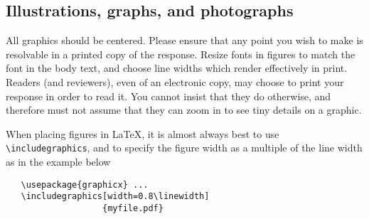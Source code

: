 \documentclass[10pt,twocolumn,letterpaper]{article}
\begin{document}
\subsection{Illustrations, graphs, and photographs}

All graphics should be centered.
Please ensure that any point you wish to make is resolvable in a printed copy of the response.
Resize fonts in figures to match the font in the body text, and choose line widths which render effectively in print.
Readers (and reviewers), even of an electronic copy, may choose to print your response in order to read it.
You cannot insist that they do otherwise, and therefore must not assume that they can zoom in to see tiny details on a graphic.

When placing figures in \LaTeX, it is almost always best to use \verb+\includegraphics+, and to specify the  figure width as a multiple of the line width as in the example below
{\small\begin{verbatim}
   \usepackage{graphicx} ...
   \includegraphics[width=0.8\linewidth]
                   {myfile.pdf}
\end{verbatim}
}


{\small


}
\end{document}
